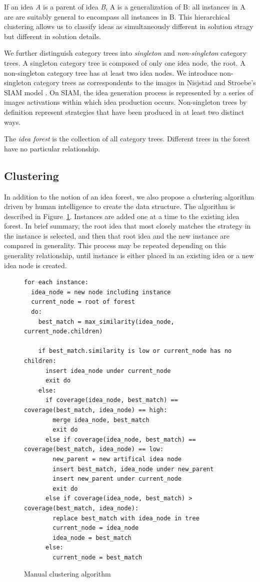 If an idea \emph{A} is a parent of idea \emph{B}, A is a generalization of B: all instances in A are are suitably general to encompass all instances in B. This hierarchical clustering allows us to classify ideas as simultaneously different in solution stragy but different in solution details.

We further distinguish category trees into \emph{singleton} and \emph{non-singleton} category trees. A singleton category tree is composed of only one idea node, the root. A non-singleton category tree has at least two idea nodes. We introduce non-singleton category trees as correspondents to the images in Nisjstad and Stroebe's SIAM model \cite{nijstad_how_2006}. On SIAM, the idea generation process is represented by a series of images activations within which idea production occurs. Non-singleton trees by definition represent strategies that have been produced in at least two distinct ways.

The \emph{idea forest} is the collection of all category trees. Different trees in the forest have no particular relationship.

\subsection{Clustering}

In addition to the notion of an idea forest, we also propose a clustering algorithm driven by human intelligence to create the data structure. The algorithm is described in Figure~\ref{fig:cluseringalg}. Instances are added one at a time to the existing idea forest. In brief summary, the root idea that most closely matches the strategy in the instance is selected, and then that root idea and the new instance are compared in generality. This process may be repeated depending on this generality relationship, until instance is either placed in an existing idea or a new idea node is created.

\begin{figure}[h!]
\small
\begin{verbatim}
for each instance:
  idea_node = new node including instance
  current_node = root of forest
  do:
    best_match = max_similarity(idea_node, current_node.children)

    if best_match.similarity is low or current_node has no children:
      insert idea_node under current_node
      exit do
    else:
      if coverage(idea_node, best_match) == coverage(best_match, idea_node) == high:
        merge idea_node, best_match
        exit do
      else if coverage(idea_node, best_match) == coverage(best_match, idea_node) == low:
        new_parent = new artifical idea node
        insert best_match, idea_node under new_parent
        insert new_parent under current_node
        exit do
      else if coverage(idea_node, best_match) > coverage(best_match, idea_node):
        replace best_match with idea_node in tree
        current_node = idea_node
        idea_node = best_match
      else:
        current_node = best_match
\end{verbatim}
\caption{Manual clustering algorithm}
\label{fig:cluseringalg}
\end{figure}

